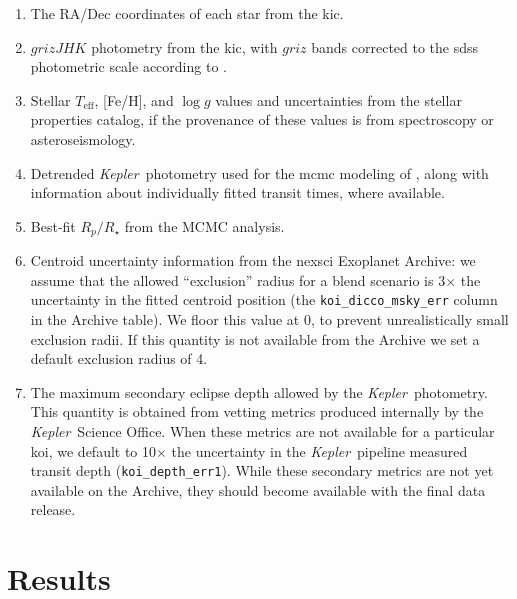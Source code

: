 \documentclass{emulateapj}
\newcommand{\nattempted}{7317}
\newcommand{\ntryfail}{75}
\newcommand{\kepler}{\textit{Kepler}}
\newcommand{\vespa}{\texttt{vespa}}
\begin{document}
\begin{enumerate}
\item The RA/Dec coordinates of each star from the \ac{kic}.
\item $grizJHK$ photometry from the \ac{kic}, with $griz$ bands
  corrected to the \ac{sdss} photometric scale according to
  \citet{Pinsonneault:2012}.
\item Stellar $T_\mathrm{eff}$, [Fe/H], and $\log g$ values and
  uncertainties from the \citet{Huber:2014} stellar properties
  catalog, if the provenance of these values is from spectroscopy or
  asteroseismology.
\item Detrended \kepler\ photometry used for the \ac{mcmc} modeling of
  \citet{Rowe:2015}, along with information about individually fitted
  transit times, where available.  
\item Best-fit $R_p/R_\star$ from the \citet{Rowe:2015} MCMC analysis.
\item Centroid uncertainty information from the \ac{nexsci} Exoplanet
  Archive: we assume that the allowed ``exclusion'' radius for a blend
  scenario is 3$\times$ the uncertainty in the fitted centroid
  position (the \verb|koi_dicco_msky_err| column in the Archive
  table).  We floor this value at 0, to prevent unrealistically
  small exclusion radii.  If this quantity is not available from the
  Archive we set a default exclusion radius of 4\arcsec.
\item The maximum secondary eclipse depth allowed by the
  \kepler\ photometry.  This quantity is obtained from vetting
  metrics produced internally by the \kepler\ Science Office.  When
  these metrics are not available for a particular \ac{koi}, we
  default to 10$\times$ the uncertainty in the \kepler\ pipeline
  measured transit depth (\verb|koi_depth_err1|).  While these
  secondary metrics are not yet available on the Archive, they should
  become available with the final data release.  
  
\end{enumerate}




\section{Results}
\label{sec:results}
\end{document}
